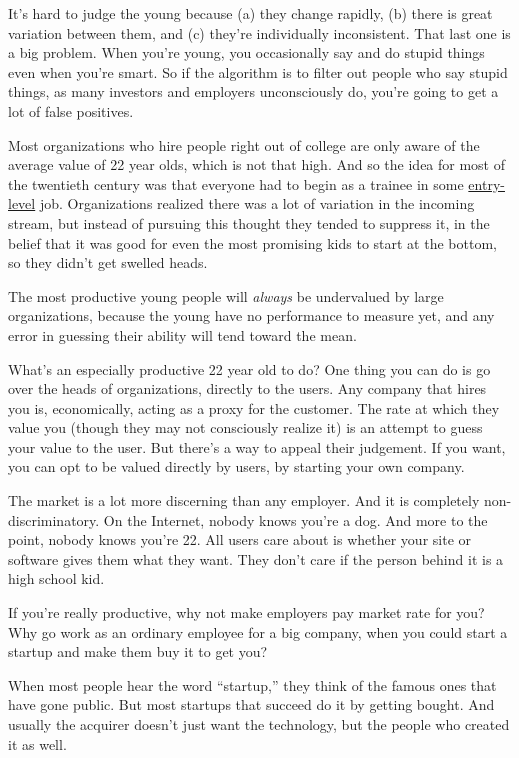 It's hard to judge the young because (a) they change rapidly, (b) there
is great variation between them, and (c) they're individually
inconsistent. That last one is a big problem. When you're young, you
occasionally say and do stupid things even when you're smart. So if the
algorithm is to filter out people who say stupid things, as many
investors and employers unconsciously do, you're going to get a lot of
false positives.

Most organizations who hire people right out of college are only aware
of the average value of 22 year olds, which is not that high. And so the
idea for most of the twentieth century was that everyone had to begin as
a trainee in some
\href{http://slashdot.org/comments.pl?sid=158756&cid=13299057}{entry-level}
job. Organizations realized there was a lot of variation in the incoming
stream, but instead of pursuing this thought they tended to suppress it,
in the belief that it was good for even the most promising kids to start
at the bottom, so they didn't get swelled heads.

The most productive young people will \emph{always} be undervalued by
large organizations, because the young have no performance to measure
yet, and any error in guessing their ability will tend toward the mean.

What's an especially productive 22 year old to do? One thing you can do
is go over the heads of organizations, directly to the users. Any
company that hires you is, economically, acting as a proxy for the
customer. The rate at which they value you (though they may not
consciously realize it) is an attempt to guess your value to the user.
But there's a way to appeal their judgement. If you want, you can opt to
be valued directly by users, by starting your own company.

The market is a lot more discerning than any employer. And it is
completely non-discriminatory. On the Internet, nobody knows you're a
dog. And more to the point, nobody knows you're 22. All users care about
is whether your site or software gives them what they want. They don't
care if the person behind it is a high school kid.

If you're really productive, why not make employers pay market rate for
you? Why go work as an ordinary employee for a big company, when you
could start a startup and make them buy it to get you?

When most people hear the word ``startup,'' they think of the famous
ones that have gone public. But most startups that succeed do it by
getting bought. And usually the acquirer doesn't just want the
technology, but the people who created it as well.

